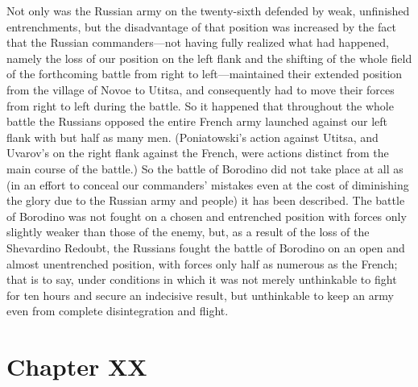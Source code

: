 Not only was the Russian army on the twenty-sixth defended by
weak, unfinished entrenchments, but the disadvantage of that
position was increased by the fact that the Russian
commanders---not having fully realized what had happened, namely
the loss of our position on the left flank and the shifting of
the whole field of the forthcoming battle from right to
left---maintained their extended position from the village of
Novoe to Utitsa, and consequently had to move their forces from
right to left during the battle. So it happened that throughout
the whole battle the Russians opposed the entire French army
launched against our left flank with but half as many
men. (Poniatowski's action against Utitsa, and Uvarov's on the
right flank against the French, were actions distinct from the
main course of the battle.) So the battle of Borodino did not
take place at all as (in an effort to conceal our commanders'
mistakes even at the cost of diminishing the glory due to the
Russian army and people) it has been described. The battle of
Borodino was not fought on a chosen and entrenched position with
forces only slightly weaker than those of the enemy, but, as a
result of the loss of the Shevardino Redoubt, the Russians fought
the battle of Borodino on an open and almost unentrenched
position, with forces only half as numerous as the French; that
is to say, under conditions in which it was not merely
unthinkable to fight for ten hours and secure an indecisive
result, but unthinkable to keep an army even from complete
disintegration and flight.


\chapter*{Chapter XX} \ifaudio {}
\fi

